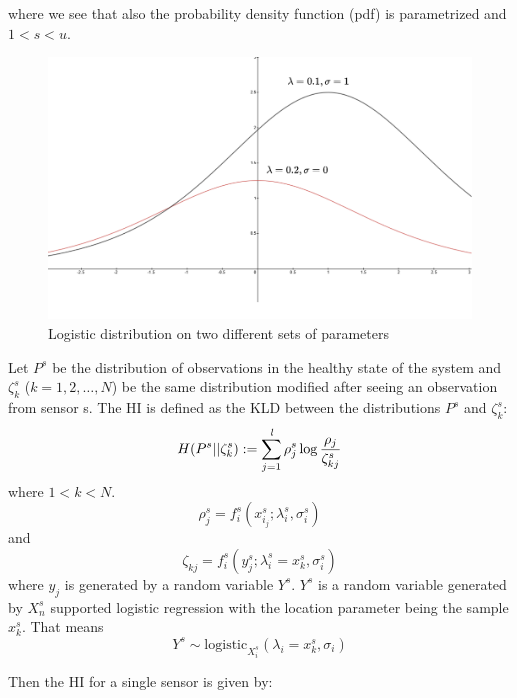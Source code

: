 where we see that also the probability density function (pdf) is parametrized and $1<s<u$.

\begin{figure}[ht]
    \centering
    \includegraphics[scale =0.25]{gfx/logistic_dist}
    \captionsetup{justification=centering}
    \caption{Logistic distribution on two different sets of parameters}
    \label{fig:logistic_dist}
\end{figure}


Let $P^s$ be the distribution of observations in the healthy state of the system and $\zeta_k^s$ ($k=1,2,\dots, N$)
be the same distribution modified after seeing an observation from sensor s. The HI is defined as the KLD between the distributions $P^s$ and $\zeta_k^s$:
\begin{equation}
    H(P^s||\zeta_k^s) := \sum_{j=1}^{\emph{l}} \rho^s_j \log \frac{\rho_j}{\zeta_{kj}^s}
\end{equation}
where $1<k<N$.
\begin{equation}
    \rho_j^s = f_i^s(x_{i_j}^s; \lambda_i^s, \sigma_i^s)
\end{equation}
and
\begin{equation}
    \zeta_{kj} = f_i^s(y_j^s; \lambda_i^s=x_k^s, \sigma_i^s)
\end{equation}
where $y_j$ is generated by a random variable $Y^s$. $Y^s$ is a random variable generated by $X_n^s$ supported logistic regression with
the location parameter being the sample $x_k^s$. That means
\begin{equation}
    Y^s \sim \text{logistic}_{X_i^s}(\lambda_i = x_k^s, \sigma_i)
\end{equation}

Then the HI for a single sensor is given by:

